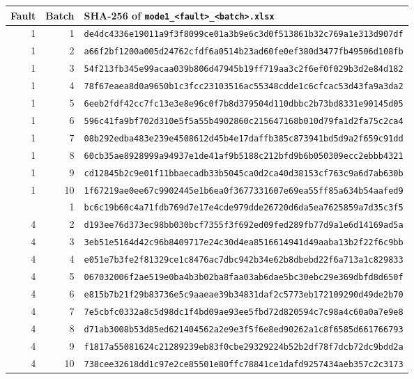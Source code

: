 \begin{tabular}{@{}rrl@{}}
\toprule
Fault & Batch & SHA-256 of \texttt{mode1\_<fault>\_<batch>.xlsx} \\
\midrule
1 & 1 & \texttt{de4dc4336e19011a9f3f8099ce01a3b9e6c3d0f513861b32c769a1e313d907df} \\
1 & 2 & \texttt{a66f2bf1200a005d24762cfdf6a0514b23ad60fe0ef380d3477fb49506d108fb} \\
1 & 3 & \texttt{54f213fb345e99acaa039b806d47945b19ff719aa3c2f6ef0f029b3d2e84d182} \\
1 & 4 & \texttt{78f67eaea8d0a9650b1c3fcc23103516ac55348cdde1c6cfcac53d43fa9a3da2} \\
1 & 5 & \texttt{6eeb2fdf42cc7fc13e3e8e96c0f7b8d379504d110dbbc2b73bd8331e90145d05} \\
1 & 6 & \texttt{596c41fa9bf702d310e5f5a55b4902860c215647168b010d79fa1d2fa75c2ca4} \\
1 & 7 & \texttt{08b292edba483e239e4508612d45b4e17daffb385c873941bd5d9a2f659c91dd} \\
1 & 8 & \texttt{60cb35ae8928999a94937e1de41af9b5188c212bfd9b6b050309ecc2ebbb4321} \\
1 & 9 & \texttt{cd12845b2c9e01f11bbaecadb33b5045ca0d2ca40d38153cf763c9a6d7ab630b} \\
1 & 10 & \texttt{1f67219ae0ee67c9902445e1b6ea0f3677331607e69ea55ff85a634b54aafed9} \\
\addlinespace
4 & 1 & \texttt{bc6c19b60c4a71fdb769d7e17e4cde979dde26720d6da5ea7625859a7d35c3f5} \\
4 & 2 & \texttt{d193ee76d373ec98bb030bcf7355f3f692ed09fed289fb77d9a1e6d14169ad5a} \\
4 & 3 & \texttt{3eb51e5164d42c96b8409717e24c30d4ea8516614941d49aaba13b2f22f6c9bb} \\
4 & 4 & \texttt{e051e7b3fe2f81329ce1c8476ac7dbc942b34e62b8dbebd22f6a713a1c829833} \\
4 & 5 & \texttt{067032006f2ae519e0ba4b3b02ba8faa03ab6dae5bc30ebc29e369dbfd8d650f} \\
4 & 6 & \texttt{e815b7b21f29b83736e5c9aaeae39b34831daf2c5773eb172109290d49de2b70} \\
4 & 7 & \texttt{7e5cbfc0332a8c5d98dc1f4bd09ae93ee5fbd72d820594c7c98a4c60a0a7e9e8} \\
4 & 8 & \texttt{d71ab3008b53d85ed621404562a2e9e3f5f6e8ed90262a1c8f6585d661766793} \\
4 & 9 & \texttt{f1817a55081624c21289239eb83f0cbe29329224b52b2df78f7dcb72dc9bdd2a} \\
4 & 10 & \texttt{738cee32618dd1c97e2ce85501e80ffc78841ce1dafd9257434aeb357c2c3173} \\

\end{tabular}
